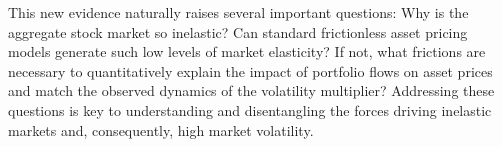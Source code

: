 This new evidence naturally raises several important questions: Why is the aggregate stock market so inelastic? Can standard frictionless asset pricing models generate such low levels of market elasticity? If not, what frictions are necessary to quantitatively explain the impact of portfolio flows on asset prices and match the observed dynamics of the volatility multiplier? Addressing these questions is key to understanding and disentangling the forces driving inelastic markets and, consequently, high market volatility.



